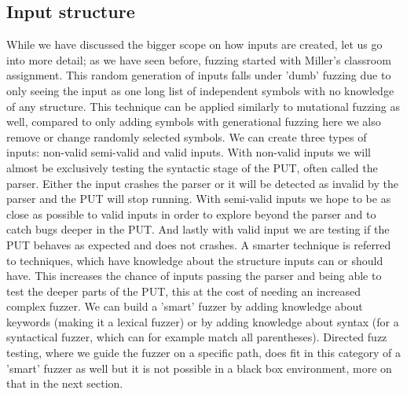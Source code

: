 \subsection{Input structure}
\label{cha:2:InputStructure}
While we have discussed the bigger scope on how inputs are created, let us go into more detail; as we have seen before, fuzzing started with Miller's classroom assignment. This random generation of inputs falls under 'dumb' fuzzing due to only seeing the input as one long list of independent symbols with no knowledge of any structure. This technique can be applied similarly to mutational fuzzing as well, compared to only adding symbols with generational fuzzing here we also remove or change randomly selected symbols. 
We can create three types of inputs: non-valid semi-valid and valid inputs. With non-valid inputs we will almost be exclusively testing the syntactic stage of the PUT, often called the parser. Either the input crashes the parser or it will be detected as invalid by the parser and the PUT will stop running. With semi-valid inputs we hope to be as close as possible to valid inputs in order to explore beyond the parser and to catch bugs deeper in the PUT. And lastly with valid input we are testing if the PUT behaves as expected and does not crashes.
A smarter technique is referred to techniques, which have knowledge about the structure inputs can or should have. This increases the chance of inputs passing the parser and being able to test the deeper parts of the PUT, this at the cost of needing an increased complex fuzzer. We can build a 'smart' fuzzer by adding knowledge about keywords (making it a lexical fuzzer) or by adding knowledge about syntax (for a syntactical fuzzer, which can for example match all parentheses). Directed fuzz testing, where we guide the fuzzer on a specific path, does fit in this category of a 'smart' fuzzer as well but it is not possible in a black box environment, more on that in the next section.

